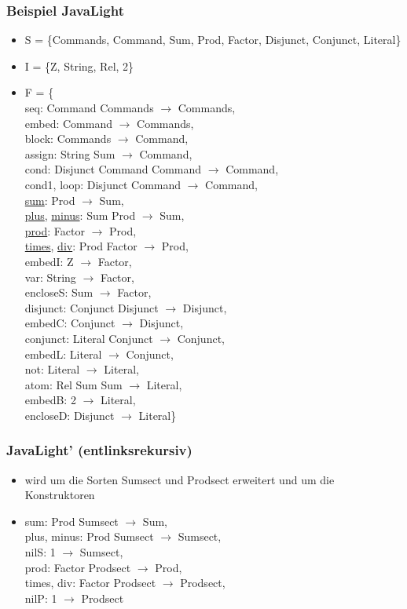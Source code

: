 \documentclass[11pt]{article}
\begin{document}
\subsubsection{Beispiel JavaLight}
\label{sec-4-5-1}
\begin{itemize}
\item S = \{Commands, Command, Sum, Prod, Factor, Disjunct, Conjunct, Literal\}
\item I = \{Z, String, Rel, 2\}
\item F = \{ \\ seq: Command \texttimes{} Commands $\to$ Commands, \\ embed: Command $\to$ Commands, \\ block: Commands $\to$ Command, \\ assign: String \texttimes{} Sum $\to$ Command, \\ cond: Disjunct \texttimes{} Command \texttimes{} Command $\to$ Command, \\ cond1, loop: Disjunct \texttimes{} Command $\to$ Command, \\ \uline{sum}: Prod $\to$ Sum, \\ \uline{plus}, \uline{minus}: Sum \texttimes{} Prod $\to$ Sum, \\ \uline{prod}: Factor $\to$ Prod, \\ \uline{times}, \uline{div}: Prod \texttimes{} Factor $\to$ Prod, \\ embedI: Z $\to$ Factor, \\ var: String $\to$ Factor, \\ encloseS: Sum $\to$ Factor, \\ disjunct: Conjunct \texttimes{} Disjunct $\to$ Disjunct, \\ embedC: Conjunct $\to$ Disjunct, \\ conjunct: Literal \texttimes{} Conjunct $\to$ Conjunct, \\ embedL: Literal $\to$ Conjunct, \\ not: Literal $\to$ Literal, \\ atom: Rel \texttimes{} Sum \texttimes{} Sum $\to$ Literal, \\ embedB: 2 $\to$ Literal, \\ encloseD: Disjunct $\to$ Literal\}
\end{itemize}


\subsubsection{JavaLight' (entlinksrekursiv)}
\label{sec-4-5-2}
\begin{itemize}
\item wird um die Sorten Sumsect und Prodsect erweitert und um die Konstruktoren
\item sum: Prod \texttimes{} Sumsect $\to$ Sum, \\ plus, minus: Prod \texttimes{} Sumsect $\to$ Sumsect, \\ nilS: 1 $\to$ Sumsect, \\ prod: Factor \texttimes{} Prodsect $\to$ Prod, \\ times, div: Factor \texttimes{} Prodsect $\to$ Prodsect, \\ nilP: 1 $\to$ Prodsect
\end{itemize}
\end{document}
